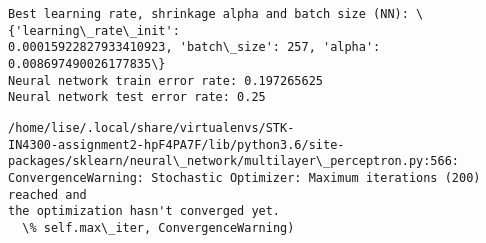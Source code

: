 \documentclass[11pt]{article}
\begin{document}
    \begin{Verbatim}[commandchars=\\\{\}]
Best learning rate, shrinkage alpha and batch size (NN): \{'learning\_rate\_init':
0.00015922827933410923, 'batch\_size': 257, 'alpha': 0.008697490026177835\}
Neural network train error rate: 0.197265625
Neural network test error rate: 0.25
    \end{Verbatim}

    \begin{Verbatim}[commandchars=\\\{\}]
/home/lise/.local/share/virtualenvs/STK-
IN4300-assignment2-hpF4PA7F/lib/python3.6/site-
packages/sklearn/neural\_network/multilayer\_perceptron.py:566:
ConvergenceWarning: Stochastic Optimizer: Maximum iterations (200) reached and
the optimization hasn't converged yet.
  \% self.max\_iter, ConvergenceWarning)
    \end{Verbatim}
\end{document}
